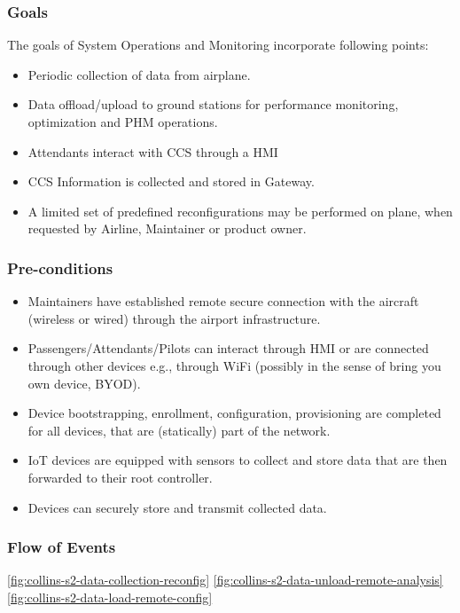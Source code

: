 \subsubsection{Goals}

The goals of System Operations and Monitoring incorporate following points:

\begin{itemize}
	\item Periodic collection of data from airplane.
	\item Data offload/upload to ground stations for performance monitoring, optimization and PHM operations.
	\item Attendants interact with CCS through a HMI
	\item CCS Information is collected and stored in Gateway.
	\item A limited set of predefined reconfigurations may be performed on plane, when requested by Airline,
	      Maintainer or product owner.
\end{itemize}

\subsubsection{Pre-conditions}
\begin{itemize}
	\item Maintainers have established remote secure connection with the aircraft (wireless or wired) through the
	      airport infrastructure.
	\item Passengers/Attendants/Pilots can interact through HMI or are connected through other devices e.g., through
	      WiFi (possibly in the sense of bring you own device, BYOD).
	\item Device bootstrapping, enrollment, configuration, provisioning are completed for all devices, that are
	      (statically) part of the network.
	\item IoT devices are equipped with sensors to collect and store data that are then forwarded to their root
	      controller.
	\item Devices can securely store and transmit collected data.
\end{itemize}

\subsubsection{Flow of Events}

\ref{fig:collins-s2-data-collection-reconfig}
\ref{fig:collins-s2-data-unload-remote-analysis}
\ref{fig:collins-s2-data-load-remote-config}

